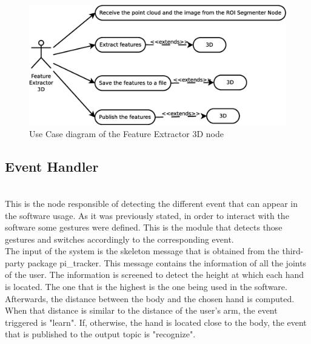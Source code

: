 	\begin{figure}[h]
		\begin{center}
			\includegraphics[scale=0.2]{img/diagrams/uc_feature_extractor_3d.eps}
			\caption[Use case diagram Feature Extractor 3D node]{Use Case diagram of the Feature Extractor 3D node}
		\end{center}
	\end{figure}

\subsection{Event Handler}\\

	This is the node responsible of detecting the different event that can appear in the software usage. As it was previously stated, in order to interact with the software some gestures were defined. This is the module that detects those gestures and switches accordingly to the corresponding event. 
	\\

	The input of the system is the skeleton message that is obtained from the third-party package pi\_tracker. This message contains the information of all the joints of the user. The information is screened to detect the height at which each hand is located. The one that is the highest is the one being used in the software. Afterwards, the distance between the body and the chosen hand is computed. When that distance is similar to the distance of the user's arm, the event triggered is "learn". If, otherwise, the hand is located close to the body, the event that is published to the output topic is "recognize". 
	\\

